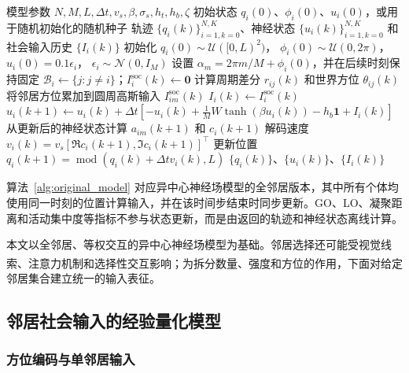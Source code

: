 \documentclass[UTF8,fontset=windows,11pt]{ctexart}
\newcommand{\upcite}[1]{\textsuperscript{\cite{#1}}}
\begin{document}
\begin{algorithm}[!tbp]
 \caption{异中心神经场模型的求解流程}
 \label{alg:original_model}
 \begin{algorithmic}[1]
 \Require 模型参数 $N,M,L,\Delta t,v_s,\beta,\sigma_s,h_t,h_b,\zeta$
 \Require 初始状态 $q_i(0)$、$\phi_i(0)$、$u_i(0)$，或用于随机初始化的随机种子
 \Ensure 轨迹 $\{q_i(k)\}_{i=1,k=0}^{N,K}$、神经状态 $\{u_i(k)\}_{i=1,k=0}^{N,K}$ 和社会输入历史 $\{I_i(k)\}$
 \State 初始化
 $q_i(0)\sim\mathcal U([0,L)^2)$，
 $\phi_i(0)\sim\mathcal U(0,2\pi)$，
 $u_i(0)=0.1\epsilon_i$，
 $\epsilon_i\sim\mathcal N(0,I_M)$
 \State 设置 $\alpha_m=2\pi m/M+\phi_i(0)$，并在后续时刻保持固定
   \State $\mathcal B_i\leftarrow\{j:j\ne i\}$；$I_i^{\mathrm{soc}}(k)\leftarrow\mathbf 0$
    \State 计算周期差分 $r_{ij}(k)$ 和世界方位 $\theta_{ij}(k)$
    \State 将邻居方位累加到圆周高斯输入 $I^{\mathrm{soc}}_{im}(k)$
   \EndFor
   \State $I_i(k)\leftarrow I^{\mathrm{soc}}_{i}(k)$
   \State $u_i(k+1)\leftarrow
   u_i(k)+\Delta t\left[-u_i(k)+\frac{1}{M}W\tanh(\beta u_i(k))-h_b\mathbf 1+I_i(k)\right]$
   \State 从更新后的神经状态计算 $a_{im}(k+1)$ 和 $c_i(k+1)$
   \State 解码速度 $v_i(k)=v_s[\Re c_i(k+1),\Im c_i(k+1)]^\top$
  \EndFor
   \State 更新位置 $q_i(k+1)=\operatorname{mod}(q_i(k)+\Delta t v_i(k),L)$
  \EndFor
 \EndFor
 \State \Return $\{q_i(k)\}$、$\{u_i(k)\}$、$\{I_i(k)\}$
 \end{algorithmic}
\end{algorithm}

算法~\ref{alg:original_model} 对应异中心神经场模型的全邻居版本，其中所有个体均使用同一时刻的位置计算输入，并在该时间步结束时同步更新。GO、LO、凝聚距离和活动集中度等指标不参与状态更新，而是由返回的轨迹和神经状态离线计算。

本文以全邻居、等权交互的异中心神经场模型为基础。邻居选择还可能受视觉线索\upcite{Krongauz2024}、注意力机制\upcite{Li2024}和选择性交互\upcite{Xue2025}影响；为拆分数量、强度和方位的作用，下面对给定邻居集合建立统一的输入表征。


\subsection{邻居社会输入的经验量化模型}
\label{sec:social_input_model}

\subsubsection{方位编码与单邻居输入}
\end{document}
